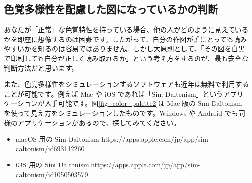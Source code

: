 \subsection{色覚多様性を配慮した図になっているかの判断}

あなたが「正常」な色覚特性を持っている場合、他の人がどのように見えているかを即座に想像するのは困難です。したがって、自分の作図が誰にとっても読みやすいかを知るのは容易ではありません。しかし大原則として、「その図を白黒で印刷しても自分が正しく読み取れるか」という考え方をするのが、最も安全な判断方法だと思います。

また、色覚多様性をシミュレーションするソフトウェアも近年は無料で利用することが可能です。例えば Mac や iOS であれば「Sim Daltonism」というアプリケーションが入手可能です。図\ref{fig_color_palette2}は Mac 版の Sim Daltonism を使って見え方をシミュレーションしたものです。Windows や Android でも同様のアプリケーションがあるので、探してみてください。

\begin{itemize}
\item macOS 用の Sim Daltonism \url{https://apps.apple.com/jp/app/sim-daltonism/id693112260}
\item iOS 用の Sim Daltonism \url{https://apps.apple.com/jp/app/sim-daltonism/id1050503579}
\end{itemize}
